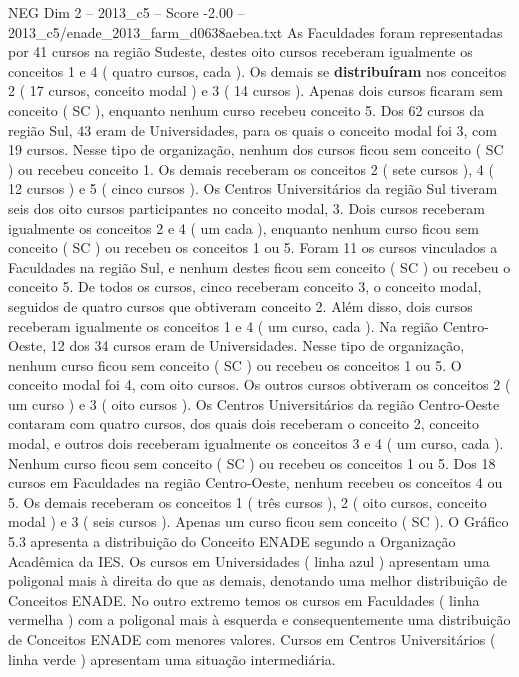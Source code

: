 \begin{textsample}{NEG Dim 2 – 2013\_c5 – Score -2.00 – 2013\_c5/enade\_2013\_farm\_d0638aebea.txt}
As Faculdades foram representadas por 41 cursos na região Sudeste, destes oito cursos receberam igualmente os conceitos 1 e 4 ( quatro cursos, cada ).
Os demais se \textbf{distribuíram} nos conceitos 2 ( 17 cursos, conceito modal ) e 3 ( 14 cursos ).
Apenas dois cursos ficaram sem conceito ( SC ), enquanto nenhum curso recebeu conceito 5.
Dos 62 cursos da região Sul, 43 eram de Universidades, para os quais o conceito modal foi 3, com 19 cursos.
Nesse tipo de organização, nenhum dos cursos ficou sem conceito ( SC ) ou recebeu conceito 1.
Os demais receberam os conceitos 2 ( sete cursos ), 4 ( 12 cursos ) e 5 ( cinco cursos ).
Os Centros Universitários da região Sul tiveram seis dos oito cursos participantes no conceito modal, 3.
Dois cursos receberam igualmente os conceitos 2 e 4 ( um cada ), enquanto nenhum curso ficou sem conceito ( SC ) ou recebeu os conceitos 1 ou 5.
Foram 11 os cursos vinculados a Faculdades na região Sul, e nenhum destes ficou sem conceito ( SC ) ou recebeu o conceito 5.
De todos os cursos, cinco receberam conceito 3, o conceito modal, seguidos de quatro cursos que obtiveram conceito 2.
Além disso, dois cursos receberam igualmente os conceitos 1 e 4 ( um curso, cada ).
Na região Centro-Oeste, 12 dos 34 cursos eram de Universidades.
Nesse tipo de organização, nenhum curso ficou sem conceito ( SC ) ou recebeu os conceitos 1 ou 5.
O conceito modal foi 4, com oito cursos.
Os outros cursos obtiveram os conceitos 2 ( um curso ) e 3 ( oito cursos ).
Os Centros Universitários da região Centro-Oeste contaram com quatro cursos, dos quais dois receberam o conceito 2, conceito modal, e outros dois receberam igualmente os conceitos 3 e 4 ( um curso, cada ).
Nenhum curso ficou sem conceito ( SC ) ou recebeu os conceitos 1 ou 5.
Dos 18 cursos em Faculdades na região Centro-Oeste, nenhum recebeu os conceitos 4 ou 5.
Os demais receberam os conceitos 1 ( três cursos ), 2 ( oito cursos, conceito modal ) e 3 ( seis cursos ).
Apenas um curso ficou sem conceito ( SC ).
O Gráfico 5.3 apresenta a distribuição do Conceito ENADE segundo a Organização Acadêmica da IES.
Os cursos em Universidades ( linha azul ) apresentam uma poligonal mais à direita do que as demais, denotando uma melhor distribuição de Conceitos ENADE.
No outro extremo temos os cursos em Faculdades ( linha vermelha ) com a poligonal mais à esquerda e consequentemente uma distribuição de Conceitos ENADE com menores valores.
Cursos em Centros Universitários ( linha verde ) apresentam uma situação intermediária.

\end{textsample}
